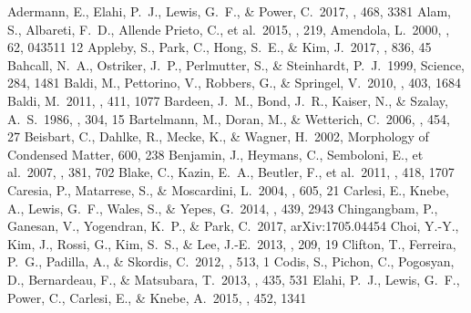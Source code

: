 \documentclass[a4paper,fleqn,usenatbib]{mnras}
\begin{document}
\begin{thebibliography}{99}
 Adermann, E., Elahi, P.~J., Lewis, G.~F., \& Power, C.\ 2017, \mnras, 468, 3381 
 Alam, S., Albareti, F.~D., Allende Prieto, C., et al.\ 2015, \apjs, 219, 
 Amendola, L.\ 2000, \prd, 62, 043511 12
 Appleby, S., Park, C., Hong, S.~E., \& Kim, J.\ 2017, \apj, 836, 45 
 Bahcall, N.~A., Ostriker, J.~P., Perlmutter, S., \& Steinhardt, P.~J.\ 1999, Science, 284, 1481 
 Baldi, M., Pettorino, V., Robbers, G., \& Springel, V.\ 2010, \mnras, 403, 1684 
 Baldi, M.\ 2011, \mnras, 411, 1077 
 Bardeen, J.~M., Bond, J.~R., Kaiser, N., \& Szalay, A.~S.\ 1986, \apj, 304, 15
 Bartelmann, M., Doran, M., \& Wetterich, C.\ 2006, \aap, 454, 27 
 Beisbart, C., Dahlke, R., Mecke, K., \& Wagner, H.\ 2002, Morphology of Condensed Matter, 600, 238 
 Benjamin, J., Heymans, C., Semboloni, E., et al.\ 2007, \mnras, 381, 702
 Blake, C., Kazin, E.~A., Beutler, F., et al.\ 2011, \mnras, 418, 1707
 Caresia, P., Matarrese, S., \& Moscardini, L.\ 2004, \apj, 605, 21 
 Carlesi, E., Knebe, A., Lewis, G.~F., Wales, S., \& Yepes, G.\ 2014, \mnras, 439, 2943 
 Chingangbam, P., Ganesan, V., Yogendran, K.~P., \& Park, C.\ 2017, arXiv:1705.04454
 Choi, Y.-Y., Kim, J., Rossi, G., Kim, S.~S., \& Lee, J.-E.\ 2013, \apjs, 209, 19 
 Clifton, T., Ferreira, P.~G., Padilla, A., \& Skordis, C.\ 2012, \physrep, 513, 1
 Codis, S., Pichon, C., Pogosyan, D., Bernardeau, F., \& Matsubara, T.\ 2013, \mnras, 435, 531 
 Elahi, P.~J., Lewis, G.~F., Power, C., Carlesi, E., \& Knebe, A.\ 2015, \mnras, 452, 1341 

\end{thebibliography}
\end{document}

